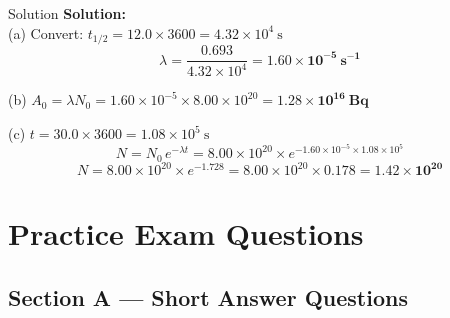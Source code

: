 \begin{examplebox}{Solution}
\textbf{Solution:}\\
(a) Convert: $t_{1/2} = 12.0 \times 3600 = 4.32\times10^4\ \text{s}$
$$\lambda = \frac{0.693}{4.32\times10^4} = \mathbf{1.60\times10^{-5}\ \text{s}^{-1}}$$

(b) $A_0 = \lambda N_0 = 1.60\times10^{-5} \times 8.00\times10^{20} = \mathbf{1.28\times10^{16}\ \text{Bq}}$

(c) $t = 30.0 \times 3600 = 1.08\times10^5\ \text{s}$
$$N = N_0\,e^{-\lambda t} = 8.00\times10^{20} \times e^{-1.60\times10^{-5}\times1.08\times10^5}$$
$$N = 8.00\times10^{20} \times e^{-1.728} = 8.00\times10^{20} \times 0.178 = \mathbf{1.42\times10^{20}}$$
\end{examplebox}

\section{Practice Exam Questions}

\subsection*{Section A — Short Answer Questions}

